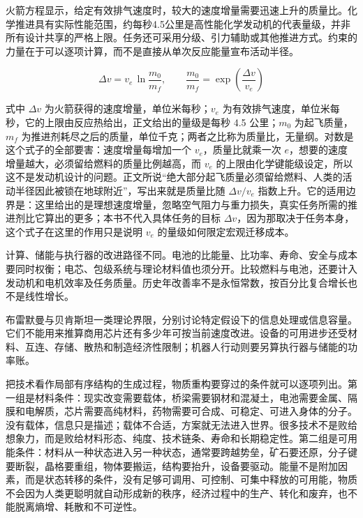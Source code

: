 火箭方程显示，给定有效排气速度时，较大的速度增量需要迅速上升的质量比。化学推进具有实际性能范围，约每秒4.5公里是高性能化学发动机的代表量级，并非所有设计共享的严格上限。任务还可采用分级、引力辅助或其他推进方式。约束的力量在于可以逐项计算，而不是直接从单次反应能量宣布活动半径。

\begin{equation}
\Delta v=v_{e}\,\ln\frac{m_{0}}{m_{f}},
\qquad
\frac{m_{0}}{m_{f}}=\exp\!\left(\frac{\Delta v}{v_{e}}\right)
\end{equation}

式中 $\Delta v$ 为火箭获得的速度增量，单位米每秒；$v_{e}$ 为有效排气速度，单位米每秒，它的上限由反应热给出，正文给出的量级是每秒 4.5 公里；$m_{0}$ 为起飞质量，$m_{f}$ 为推进剂耗尽之后的质量，单位千克；两者之比称为质量比，无量纲。对数是这个式子的全部要害：速度增量每增加一个 $v_{e}$，质量比就乘一次 $e$，想要的速度增量越大，必须留给燃料的质量比例越高，而 $v_{e}$ 的上限由化学键能级设定，所以这不是发动机设计的问题。正文所说“绝大部分起飞质量必须留给燃料、人类的活动半径因此被锁在地球附近”，写出来就是质量比随 $\Delta v/v_{e}$ 指数上升。它的适用边界是：这里给出的是理想速度增量，忽略空气阻力与重力损失，真实任务所需的推进剂比它算出的更多；本书不代入具体任务的目标 $\Delta v$，因为那取决于任务本身，这个式子在这里的作用只是说明 $v_{e}$ 的量级如何限定宏观迁移成本。


计算、储能与执行器的改进路径不同。电池的比能量、比功率、寿命、安全与成本要同时权衡；电芯、包级系统与理论材料值也须分开。比较燃料与电池，还要计入发动机和电机效率及任务质量。历史年改善率不是永恒常数，按百分比复合增长也不是线性增长。\cite{ziegler2021reexamining,viswanathan2022challenges}

布雷默曼与贝肯斯坦一类理论界限，分别讨论特定假设下的信息处理或信息容量。\cite{bremermann1982minimum,bekenstein1981universal} 它们不能用来推算商用芯片还有多少年可按当前速度改进。设备的可用进步还受材料、互连、存储、散热和制造经济性限制；机器人行动则要另算执行器与储能的功率账。


把技术看作局部有序结构的生成过程，物质重构要穿过的条件就可以逐项列出。第一组是材料条件：现实改变需要载体，桥梁需要钢材和混凝土，电池需要金属、隔膜和电解质，芯片需要高纯材料，药物需要可合成、可稳定、可进入身体的分子。没有载体，信息只是描述；载体不合适，方案就无法进入世界。很多技术不是败给想象力，而是败给材料形态、纯度、技术链条、寿命和长期稳定性。第二组是可用能条件：材料从一种状态进入另一种状态，通常要跨越势垒，矿石要还原，分子键要断裂，晶格要重组，物体要搬运，结构要抬升，设备要驱动。能量不是附加因素，而是状态转移的条件，没有足够可调用、可控制、可集中释放的可用能，物质不会因为人类更聪明就自动形成新的秩序，经济过程中的生产、转化和废弃，也不能脱离熵增、耗散和不可逆性。\cite{georgescu1971entropy}

